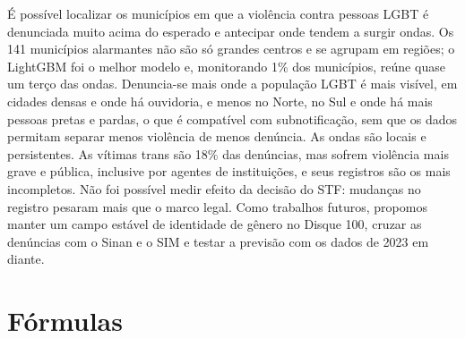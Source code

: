 \documentclass[12pt]{article}
\begin{document}
É possível localizar os municípios em que a violência contra pessoas LGBT é denunciada muito acima do esperado e antecipar onde tendem a surgir ondas. Os 141 municípios alarmantes não são só grandes centros e se agrupam em regiões; o LightGBM foi o melhor modelo e, monitorando 1\% dos municípios, reúne quase um terço das ondas. Denuncia-se mais onde a população LGBT é mais visível, em cidades densas e onde há ouvidoria, e menos no Norte, no Sul e onde há mais pessoas pretas e pardas, o que é compatível com subnotificação, sem que os dados permitam separar menos violência de menos denúncia. As ondas são locais e persistentes. As vítimas trans são 18\% das denúncias, mas sofrem violência mais grave e pública, inclusive por agentes de instituições, e seus registros são os mais incompletos. Não foi possível medir efeito da decisão do STF: mudanças no registro pesaram mais que o marco legal. Como trabalhos futuros, propomos manter um campo estável de identidade de gênero no Disque 100, cruzar as denúncias com o Sinan e o SIM e testar a previsão com os dados de 2023 em diante.


\appendix

\section{Fórmulas}
\end{document}
